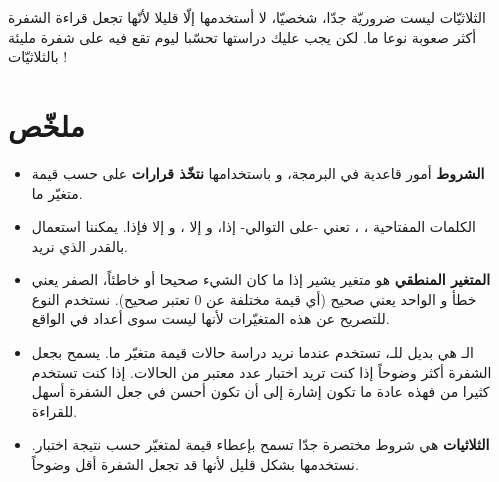 الثلاثيّات ليست ضروريّة جدّا، شخصيّا، لا أستخدمها إلّا قليلا لأنّها تجعل قراءة الشفرة أكثر صعوبة نوعا ما. لكن يجب عليك دراستها تحسّبا ليوم تقع فيه على شفرة مليئة بالثلاثيّات !

\section*{ملخّص}

\begin{itemize}
	\item \textbf{الشروط}
	أمور قاعدية في البرمجة، و باستخدامها 
	\textbf{نتخّذ قرارات}
	 على حسب قيمة متغيّر ما.
	\item الكلمات المفتاحية
	 ،
	 ،
	 تعني -على التوالي- إذا، و إلا ، و إلا فإذا. يمكننا استعمال
	 بالقدر الذي نريد.
	 \item \textbf{المتغير المنطقي}
	 هو متغير يشير إذا ما كان الشيء صحيحا أو خاطئاً، الصفر يعني خطأ و الواحد يعني صحيح (أي قيمة مختلفة عن 0 تعتبر صحيح). نستخدم النوع
	 للتصريح عن هذه المتغيّرات لأنها ليست سوى أعداد في الواقع.
	 \item الـ
	 هي بديل للـ،
	  تستخدم عندما نريد دراسة حالات قيمة متغيّر ما. يسمح بجعل الشفرة أكثر وضوحاً إذا كنت تريد اختبار عدد معتبر من الحالات. إذا كنت تستخدم كثيرا من
	 فهذه عادة ما تكون إشارة إلى أن 
	 تكون أحسن في جعل الشفرة أسهل للقراءة.
	 \item \textbf{الثلاثيات} 
	 هي شروط مختصرة جدّا تسمح بإعطاء قيمة لمتغيّر حسب نتيجة اختبار. نستخدمها بشكل قليل لأنها قد تجعل الشفرة أقل وضوحاً.
\end{itemize}
